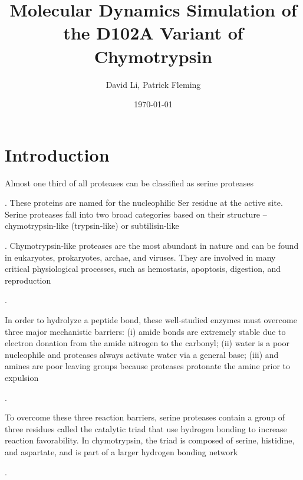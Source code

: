 \documentclass[12pt, twocolumn]{article}
\newcommand*{\nolink}[1]{%
\begin{NoHyper}#1\end{NoHyper}%
}
\begin{document}
\title{Molecular Dynamics Simulation of the D102A Variant of Chymotrypsin}
\author{David Li, Patrick Fleming}
\date{\today}
\maketitle

\section{Introduction}
Almost one third of all proteases can be classified as serine proteases~\nolink{\cite{hedstrom02}}.
These proteins are named for the nucleophilic Ser residue at the active site.
Serine proteases fall into two broad categories based on their structure
-- chymotrypsin-like (trypsin-like) or subtilisin-like~\nolink{\cite{madala10}}.
Chymotrypsin-like proteases are the most abundant in nature and can be found in
eukaryotes, prokaryotes, archae, and viruses. They are involved in many critical
physiological processes, such as hemostasis, apoptosis, digestion, and reproduction
~\nolink{\cite{hedstrom02}}.

In order to hydrolyze a peptide bond, these well-studied enzymes must overcome
three major mechanistic barriers: (i) amide bonds are extremely stable due to electron
donation from the amide nitrogen to the carbonyl; (ii) water is a poor nucleophile
and proteases always activate water via a general base; (iii) and amines are poor leaving
groups because proteases protonate the amine prior to expulsion~\nolink{\cite{hedstrom02}}.

To overcome these three reaction barriers, serine proteases contain a group of three
residues called the catalytic triad that use hydrogen bonding to increase reaction favorability.
In chymotrypsin, the triad is composed of serine, histidine, and aspartate, and is part of
a larger hydrogen bonding network~\nolink{\cite{hedstrom02}}.
\end{document}
